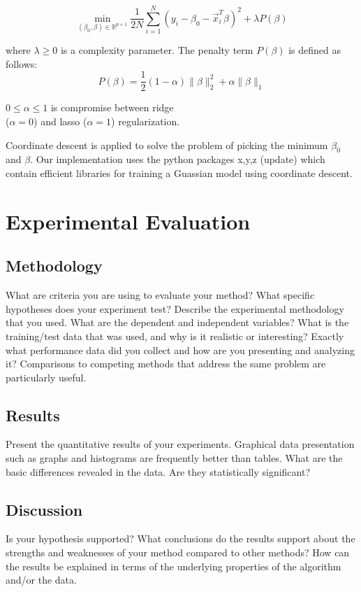 \documentclass[11pt]{article}
\begin{document}
$$ \min_{(\beta_0, \beta) \in \mathbb{R}^{p+1}} \frac{1}{2N} \sum_{i=1}^N (y_i - \beta_0 
- \vec{x}_i^T\beta)^2 + \lambda P(\beta)$$

where $\lambda \geq 0$ is a complexity parameter. The penalty term $P(\beta)$ is 
defined as follows:
$$P(\beta) = \frac{1}{2}(1 - \alpha) \| \beta \|_2^2 + \alpha \|\beta\|_1$$

$0 \leq \alpha \leq 1$ is compromise between ridge\\ ($\alpha = 0$) and lasso
($\alpha = 1$) regularization.

Coordinate descent is applied to solve the problem of picking the minimum $\beta_0$ and
$\beta$. Our implementation uses the python packages x,y,z (update) which contain
efficient libraries for training a Guassian model using coordinate descent.

\section{Experimental Evaluation}
\subsection{Methodology}
What are criteria you are using to evaluate your method? What specific hypotheses does
your experiment test? Describe the experimental methodology that you used. What are the
dependent and independent variables? What is the training/test data that was used, and why
is it realistic or interesting? Exactly what performance data did you collect and how are
you presenting and analyzing it? Comparisons to competing methods that address the same
problem are particularly useful.

\subsection{Results}
Present the quantitative results of your experiments. Graphical data presentation such as
graphs and histograms are frequently better than tables. What are the basic differences
revealed in the data. Are they statistically significant?

\subsection{Discussion}
Is your hypothesis supported? What conclusions do the results support about the strengths
and weaknesses of your method compared to other methods? How can the results be explained
in terms of the underlying properties of the algorithm and/or the data.
\end{document}
